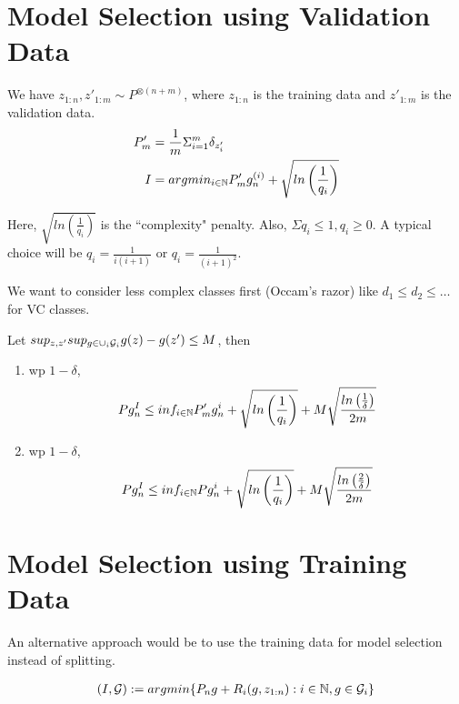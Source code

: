 \documentclass[twoside]{article}
\begin{document}
\section{Model Selection using Validation Data}
We have $z_{1:n}, z'_{1:m} \sim P^{\otimes(n+m)}$, where $z_{1:n}$ is the training data and $z'_{1:m}$ is the validation data.
\begin{align*}
    P'_m &= \frac{1}{m} \Sigma_{i=1}^{m} \delta_{z'_i} \\
    I &= argmin_{i \in \mathbb{N}} P'_m g_n^{(i)} + \sqrt{ln\left(\frac{1}{q_i}\right)}
\end{align*}

Here, $\sqrt{ln\left(\frac{1}{q_i}\right)}$ is the ``complexity" penalty. Also, $\Sigma q_i \leq 1, q_i \geq 0$. A typical choice will be $q_i = \frac{1}{i(i+1)}$ or $q_i = \frac{1}{(i+1)^2}$.

We want to consider less complex classes first (Occam's razor) like $d_1 \leq d_2 \leq \dots$ for VC classes.

\begin{theorem}
    Let $sup_{z, z'} sup_{g \in \cup_i \mathcal{G}_i} g(z) - g(z') \leq M$, then
    \begin{enumerate}
        \item wp $1-\delta$,
            \begin{align*}
                Pg_n^{I} \leq inf_{i \in \mathbb{N}} P'_m g_n^{i} + \sqrt{ln\left(\frac{1}{q_i}\right)} + M\sqrt{\frac{ln\left(\frac{1}{\delta}\right)}{2m}}
            \end{align*}
        \item wp $1-\delta$,
            \begin{align*}
                Pg_n^{I} \leq inf_{i \in \mathbb{N}} Pg_n^{i} + \sqrt{ln\left(\frac{1}{q_i}\right)} + M\sqrt{\frac{ln\left(\frac{2}{\delta}\right)}{2m}}
            \end{align*}
    \end{enumerate}
\end{theorem}

\section{Model Selection using Training Data}
An alternative approach would be to use the training data for model selection instead of splitting.

\begin{align*}
    (I, \mathcal{G}) := argmin \{P_n g + R_i(g, z_{1:n}) : i \in \mathbb{N}, g \in \mathcal{G}_i\}
\end{align*}
\end{document}
